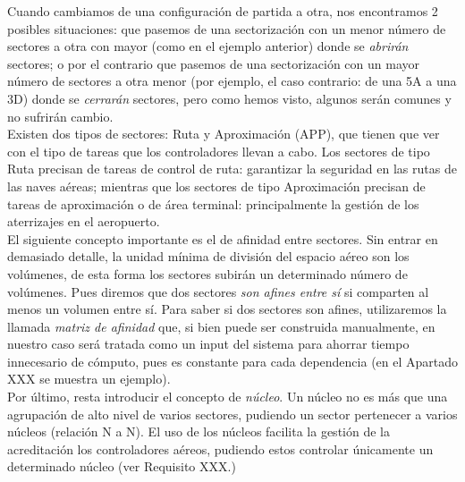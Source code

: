 Cuando cambiamos de una configuración de partida a otra, nos encontramos 2 posibles situaciones: que pasemos de una sectorización
con un menor número de sectores a otra con mayor (como en el ejemplo anterior) donde se \textit{abrirán} sectores; o por el
contrario que pasemos de una sectorización con un mayor número de sectores a otra menor (por ejemplo, el caso contrario: de una 5A a una 3D)
donde se \textit{cerrarán} sectores, pero como hemos visto, algunos serán comunes y no sufrirán cambio.
\\

Existen dos tipos de sectores: Ruta y Aproximación (APP), que tienen que ver con el tipo de tareas que los controladores llevan a cabo.
Los sectores de tipo Ruta precisan de tareas de control de ruta: garantizar la seguridad en las rutas de las naves aéreas; mientras que los sectores de tipo Aproximación precisan de tareas de aproximación o de área terminal: principalmente la gestión de los aterrizajes en el aeropuerto.
\\

El siguiente concepto importante es el de afinidad entre sectores. Sin entrar en demasiado detalle, la unidad mínima de
división del espacio aéreo son los volúmenes, de esta forma los sectores subirán un determinado número de volúmenes.
Pues diremos que dos sectores \textit{son afines entre sí} si comparten al menos un volumen entre sí. Para saber si dos
sectores son afines, utilizaremos la llamada \textit{matriz de afinidad} que, si bien puede ser construida manualmente,
en nuestro caso será tratada como un input del sistema para ahorrar tiempo innecesario de cómputo, pues es constante 
para cada dependencia (en el Apartado XXX se muestra un ejemplo). %
\\

Por último, resta introducir el concepto de \textit{núcleo}. Un núcleo no es más que una agrupación de alto nivel de
varios sectores, pudiendo un sector pertenecer a varios núcleos (relación N a N). El uso de los núcleos facilita la
gestión de la acreditación los controladores aéreos, pudiendo estos controlar únicamente un determinado núcleo (ver Requisito XXX.) %


% 

